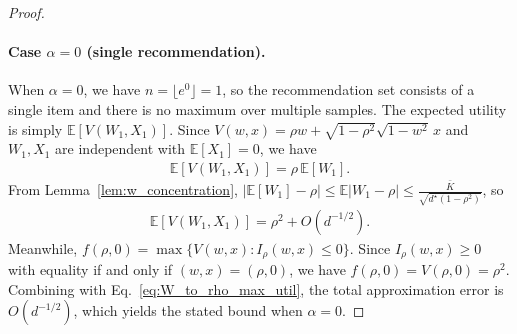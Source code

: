 \documentclass[12pt]{article}
\theoremstyle{definition}
\theoremstyle{remark}
\begin{document}
\begin{proof}
{\paragraph{Case $\alpha = 0$ (single recommendation).} When $\alpha = 0$, we have $n = \lfloor e^{0} \rfloor = 1$, so the recommendation set consists of a single item and there is no maximum over multiple samples. The expected utility is simply $\mathbb{E}[V(W_1, X_1)]$. Since $V(w,x) = \rho w + \sqrt{1-\rho^2}\sqrt{1-w^2}\, x$ and $W_1, X_1$ are independent with $\mathbb{E}[X_1] = 0$, we have
\begin{align*}
    \mathbb{E}[V(W_1, X_1)] = \rho\, \mathbb{E}[W_1].
\end{align*}
From Lemma~\ref{lem:w_concentration}, $|\mathbb{E}[W_1] - \rho| \leq \mathbb{E}|W_1 - \rho| \leq \frac{\bar K}{\sqrt{d^\star(1-\rho^2)}}$, so
\begin{align*}
    \mathbb{E}[V(W_1, X_1)] = \rho^2 + O(d^{-1/2}).
\end{align*}
Meanwhile, $f(\rho, 0) = \max\{V(w,x) : I_\rho(w,x) \leq 0\}$. Since $I_\rho(w,x) \geq 0$ with equality if and only if $(w,x) = (\rho, 0)$, we have $f(\rho, 0) = V(\rho, 0) = \rho^2$. Combining with Eq.~\eqref{eq:W_to_rho_max_util}, the total approximation error is $O(d^{-1/2})$, which yields the stated bound when $\alpha =0$.

}
\end{proof}
\end{document}
